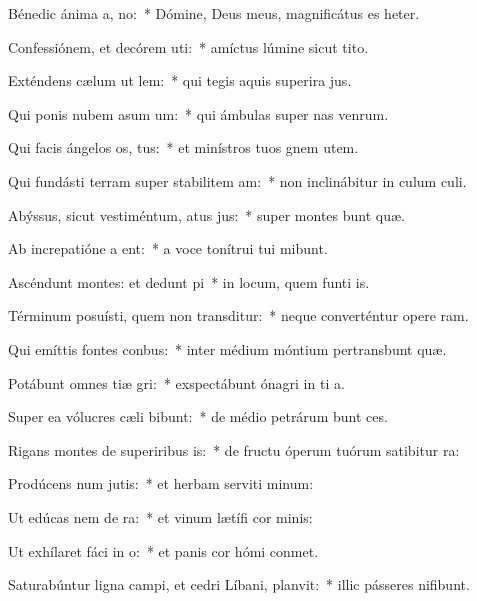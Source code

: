 \item Bénedic ánima a, no:~* Dómine, Deus meus, magnificátus es heter.
\item Confessiónem, et decórem uti:~* amíctus lúmine sicut tito.
\item Exténdens cælum ut lem:~* qui tegis aquis superira jus.
\item Qui ponis nubem asum um:~* qui ámbulas super nas venrum.
\item Qui facis ángelos os, tus:~* et minístros tuos gnem utem.
\item Qui fundásti terram super stabilitem am:~* non inclinábitur in culum culi.
\item Abýssus, sicut vestiméntum, atus jus:~* super montes bunt quæ.
\item Ab increpatióne a ent:~* a voce tonítrui tui mibunt.
\item Ascéndunt montes: et dedunt pi~* in locum, quem funti is.
\item Términum posuísti, quem non transditur:~* neque converténtur opere ram.
\item Qui emíttis fontes  conbus:~* inter médium móntium pertransbunt quæ.
\item Potábunt omnes tiæ gri:~* exspectábunt ónagri in ti a.
\item Super ea vólucres cæli bibunt:~* de médio petrárum bunt ces.
\item Rigans montes de superiribus is:~* de fructu óperum tuórum satibitur ra:
\item Prodúcens num jutis:~* et herbam serviti minum:
\item Ut edúcas nem de ra:~* et vinum lætífi cor minis:
\item Ut exhílaret fáci in o:~* et panis cor hómi conmet.
\item Saturabúntur ligna campi, et cedri Líbani,  planvit:~* illic pásseres nifibunt.
